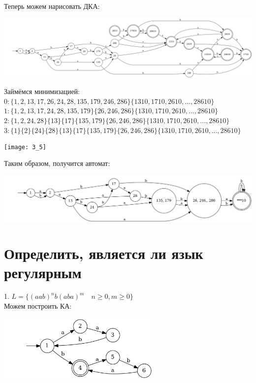 \documentclass{article}
\begin{document}
    Теперь можем нарисовать ДКА:
    \begin{center}
        \includegraphics[width=1\textwidth]{pic3_5_2.dot}\\
    \end{center}
    Займёмся минимизацией:\\
    $0: \{1, 2, 13, 17, 26, 24, 28, 135, 179, 246, 286\}\{1310, 1710, 2610, ..., 28610\}$\\
    $1: \{1, 2, 13, 17, 24, 28, 135, 179\}\{26, 246, 286\}\{1310, 1710, 2610, ...,28610\}$\\
    $2: \{1, 2, 24, 28\}\{13\}\{17\}\{135, 179\}\{26, 246, 286\}\{1310, 1710, 2610, ...,28610\}$\\
    $3: \{1\}\{2\}\{24\}\{28\}\{13\}\{17\}\{135, 179\}\{26, 246, 286\}\{1310, 1710, 2610, ...,28610\}$\\
    \begin{center}
        \texttt{[image: 3\_5]}\\
    \end{center}
    Таким образом, получится автомат:
    \begin{center}
        \includegraphics[width=1\textwidth]{pic3_5_3.dot}\\
    \end{center}
    
\section{Определить, является ли язык регулярным}
    1. $L=\{(aab)^nb(aba)^m \quad n \geq 0, m\geq 0\}$\\
    Можем построить КА:
    \begin{center}
        \includegraphics[width=0.6\textwidth]{pic4_1_1.dot}\\
    \end{center}
    
\end{document}
